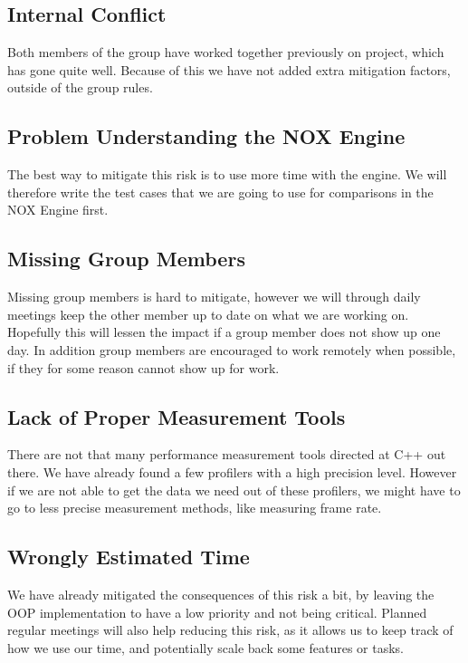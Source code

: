 \subsection*{Internal Conflict}
Both members of the group have worked together previously on project,
which has gone quite well. 
Because of this we have not added extra mitigation factors, 
outside of the group rules.

\subsection*{Problem Understanding the NOX Engine}
The best way to mitigate this risk is to use more time with the engine.
We will therefore write the test cases that we are
going to use for comparisons in the NOX Engine first.


\subsection*{Missing Group Members}
Missing group members is hard to mitigate, however 
we will through daily meetings keep the other member
up to date on what we are working on. 
Hopefully this will lessen the impact if a group member
does not show up one day.
In addition group members are encouraged to work remotely when possible,
if they for some reason cannot show up for work.

\subsection*{Lack of Proper Measurement Tools}
There are not that many performance measurement tools
directed at C++ out there. 
We have already found a few profilers with a high precision level. 
However if we are not able to get the data we need out of these profilers,
we might have to go to less precise measurement methods,
like measuring frame rate.

\subsection*{Wrongly Estimated Time}
We have already mitigated the consequences of this risk a bit, by leaving the OOP
implementation to have a low priority and not being critical.
Planned regular meetings will also help reducing this risk, as it allows us to keep 
track of how we use our time, and potentially scale back some features or tasks.